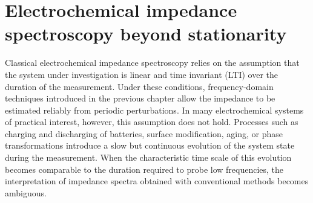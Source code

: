 \chapter{Electrochemical impedance spectroscopy beyond stationarity}
\label{ch:deis state art}





Classical electrochemical impedance spectroscopy relies on the assumption that the system under investigation is linear and time invariant (LTI) over the duration of the measurement.
Under these conditions, frequency-domain techniques introduced in the previous chapter allow the impedance to be estimated reliably from periodic perturbations.
In many electrochemical systems of practical interest, however, this assumption does not hold.
Processes such as charging and discharging of batteries, surface modification, aging, or phase transformations introduce a slow but continuous evolution of the system state during the measurement.
When the characteristic time scale of this evolution becomes comparable to the duration required to probe low frequencies, the interpretation of impedance spectra obtained with conventional methods becomes ambiguous.

